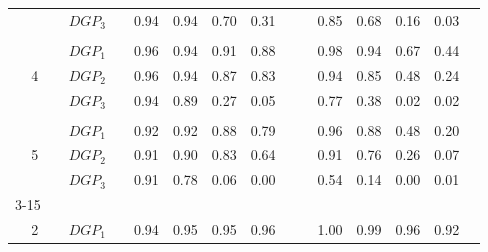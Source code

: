 \begin{table}[htbp]
{\begin{tabular}{cc|ccccccc|cccccc|}
    \multicolumn{2}{c|}{} & \multicolumn{1}{l}{$DGP_{3}$} & & \multicolumn{1}{c}{0.94} & \multicolumn{1}{c}{0.94} & \multicolumn{1}{c}{0.70} & \multicolumn{1}{c}{0.31} & & & \multicolumn{1}{c}{0.85} & \multicolumn{1}{c}{0.68} & \multicolumn{1}{c}{0.16} & \multicolumn{1}{c}{0.03} & \\
    & & & & & & & & & & & & & & \\
    \multicolumn{2}{c|}{\multirow{3}{*}{4}} & \multicolumn{1}{l}{$DGP_{1}$} & & \multicolumn{1}{c}{0.96} & \multicolumn{1}{c}{0.94} & \multicolumn{1}{c}{0.91} & \multicolumn{1}{c}{0.88} & & & \multicolumn{1}{c}{0.98} & \multicolumn{1}{c}{0.94} & \multicolumn{1}{c}{0.67} & \multicolumn{1}{c}{0.44} & \\
    \multicolumn{2}{c|}{} & \multicolumn{1}{l}{$DGP_{2}$} & & \multicolumn{1}{c}{0.96} & \multicolumn{1}{c}{0.94} & \multicolumn{1}{c}{0.87} & \multicolumn{1}{c}{0.83} & & & \multicolumn{1}{c}{0.94} & \multicolumn{1}{c}{0.85} & \multicolumn{1}{c}{0.48} & \multicolumn{1}{c}{0.24} & \\
    \multicolumn{2}{c|}{} & \multicolumn{1}{l}{$DGP_{3}$} & & \multicolumn{1}{c}{0.94} & \multicolumn{1}{c}{0.89} & \multicolumn{1}{c}{0.27} & \multicolumn{1}{c}{0.05} & & & \multicolumn{1}{c}{0.77} & \multicolumn{1}{c}{0.38} & \multicolumn{1}{c}{0.02} & \multicolumn{1}{c}{0.02} & \\
    & & & & & & & & & & & & & & \\
    \multicolumn{2}{c|}{\multirow{3}{*}{5}} & \multicolumn{1}{l}{$DGP_{1}$} & & \multicolumn{1}{c}{0.92} & \multicolumn{1}{c}{0.92} & \multicolumn{1}{c}{0.88} & \multicolumn{1}{c}{0.79} & & & \multicolumn{1}{c}{0.96} & \multicolumn{1}{c}{0.88} & \multicolumn{1}{c}{0.48} & \multicolumn{1}{c}{0.20} & \\
    \multicolumn{2}{c|}{} & \multicolumn{1}{l}{$DGP_{2}$} & & \multicolumn{1}{c}{0.91} & \multicolumn{1}{c}{0.90} & \multicolumn{1}{c}{0.83} & \multicolumn{1}{c}{0.64} & & & \multicolumn{1}{c}{0.91} & \multicolumn{1}{c}{0.76} & \multicolumn{1}{c}{0.26} & \multicolumn{1}{c}{0.07} & \\
    \multicolumn{2}{c|}{} & \multicolumn{1}{l}{$DGP_{3}$} & & \multicolumn{1}{c}{0.91} & \multicolumn{1}{c}{0.78} & \multicolumn{1}{c}{0.06} & \multicolumn{1}{c}{0.00} & & & \multicolumn{1}{c}{0.54} & \multicolumn{1}{c}{0.14} & \multicolumn{1}{c}{0.00} & \multicolumn{1}{c}{0.01} & \\
    \cmidrule{3-15}
    & & & & & & & & & & & & & & \\
    \multicolumn{2}{c|}{\multirow{3}{*}{2}} & \multicolumn{1}{l}{$DGP_{1}$} & & \multicolumn{1}{c}{0.94} & \multicolumn{1}{c}{0.95} & \multicolumn{1}{c}{0.95} & \multicolumn{1}{c}{0.96} & & & \multicolumn{1}{c}{1.00} & \multicolumn{1}{c}{0.99} & \multicolumn{1}{c}{0.96} & \multicolumn{1}{c}{0.92} & \\

\end{tabular}}
\end{table}

